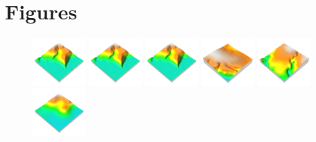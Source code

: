 \documentclass[prodmode,acmtochi]{acmsmall} %
\begin{document}
\maketitle

\pagebreak

\section{Figures}


\begin{figure}[h!]
\begin{center}
		\includegraphics[width=0.18\textwidth]{images/render_3d/dem_1.png}
		\includegraphics[width=0.18\textwidth]{images/render_3d/dem_2.png}
		\includegraphics[width=0.18\textwidth]{images/render_3d/dem_3.png}
		\includegraphics[width=0.18\textwidth]{images/render_3d/dem_4.png}
		\includegraphics[width=0.18\textwidth]{images/render_3d/dem_5.png}
		\includegraphics[width=0.18\textwidth]{images/render_3d/mean_dem_1.png}

\end{center}
\end{figure}
\end{document}

